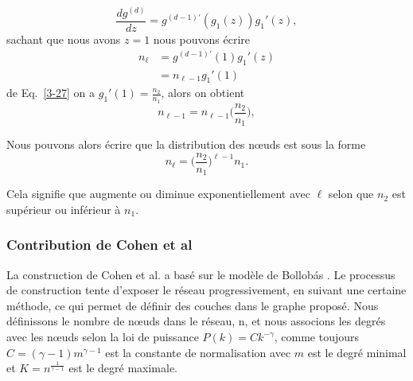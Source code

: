 \begin{equation}
\frac{dg^{(d)}}{dz}=g^{(d-1)'}(g_1(z))g_1'(z),
\end{equation}
sachant que nous avons $z=1$ nous pouvons écrire 
\begin{align}
n_{\ell}&=g^{(d-1)'}(1)g_1'(z)\\
&=n_{\ell-1}g_1'(1)\nonumber
\end{align}
de Eq.~\eqref{3-27} on a $g_1'(1)=\frac{n_2}{n_1}$, alors on obtient 
\begin{equation}
n_{\ell-1}=n_{\ell-1}\Big(\frac{n_2}{n_1}\Big),
\end{equation}

Nous pouvons alors écrire que la distribution des nœuds est sous la forme
\begin{equation}
 n_{\ell}=\Big(\frac{n_2}{n_1}\Big)^{\ell-1}n_1.
\end{equation} 

Cela signifie que \nl augmente ou diminue exponentiellement avec $\ell$ selon que $n_2$ est supérieur ou inférieur à $n_1$.

\subsubsection{Contribution de Cohen et al}
La construction de Cohen et al. \cite{Cohen-Havlinl2010-72,Kalisky-al2006} a basé sur le modèle de Bollobás \cite{Bollobas1985}. Le processus de construction tente d'exposer le réseau progressivement, en suivant une certaine méthode, ce qui permet de définir des couches  dans le graphe proposé. Nous définissons le nombre de nœuds dans le réseau, n, et nous associons les degrés avec les nœuds selon la loi de puissance $P(k)=Ck^{-\gamma}$, comme toujours $C=(\gamma-1)m^{\gamma-1}$ est la constante de normalisation avec $m$ est le degré minimal et $K=n^{\frac{1}{\gamma-1}}$ est le degré maximale.\\

